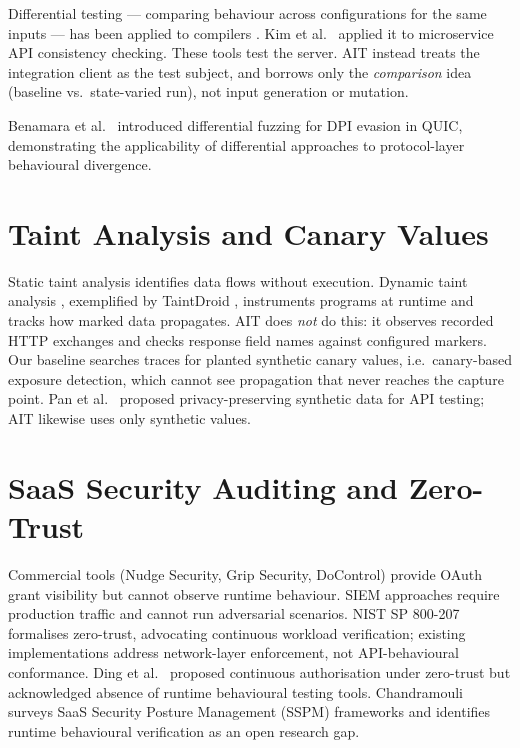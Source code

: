 \documentclass[12pt,a4paper]{report}
\begin{document}
Differential testing --- comparing behaviour across configurations for the same inputs --- has
been applied to compilers \cite{yang2011}. Kim et al.\ \cite{kim2022} applied it to
microservice API consistency checking. These tools test the server. AIT instead treats the
integration client as the test subject, and borrows only the \emph{comparison} idea (baseline
vs.\ state-varied run), not input generation or mutation.

Benamara et al.\ \cite{benamara2020} introduced differential fuzzing for DPI evasion in QUIC,
demonstrating the applicability of differential approaches to protocol-layer behavioural
divergence.

\section{Taint Analysis and Canary Values}

Static taint analysis \cite{livshits2005} identifies data flows without execution. Dynamic taint
analysis \cite{clause2007}, exemplified by TaintDroid \cite{taintdroid2014}, instruments
programs at runtime and tracks how marked data propagates. AIT does \emph{not} do this: it
observes recorded HTTP exchanges and checks response field names against configured markers.
Our baseline searches traces for planted synthetic canary values, i.e.\ canary-based exposure
detection, which cannot see propagation that never reaches the capture point. Pan et al.\
\cite{pan2022} proposed privacy-preserving synthetic data for API testing; AIT likewise uses only
synthetic values.

\section{SaaS Security Auditing and Zero-Trust}

Commercial tools (Nudge Security, Grip Security, DoControl) provide OAuth grant visibility but
cannot observe runtime behaviour. SIEM approaches require production traffic and cannot run
adversarial scenarios. NIST SP 800-207 \cite{nist800207} formalises zero-trust, advocating
continuous workload verification; existing implementations address network-layer enforcement,
not API-behavioural conformance. Ding et al.\ \cite{ding2023} proposed continuous
authorisation under zero-trust but acknowledged absence of runtime behavioural testing tools.
Chandramouli \cite{chandramouli2023} surveys SaaS Security
Posture Management (SSPM) frameworks and identifies runtime behavioural verification as an
open research gap.
\end{document}

